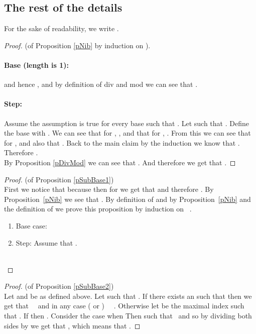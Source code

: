 \documentclass[envcountsame]{llncs}
\begin{document}
\subsection{The rest of the details}
\noindent
For the sake of readability, we write .

\begin{proof}(of Proposition \ref{pNib} by induction on ). 
  \paragraph{Base (length is 1):}  and hence ,  and by
  definition of div and mod we can see
  that  .
  \paragraph{Step:} Assume the assumption is true for every base 
  such that .  Let  such that . Define the base
   with .
We can see
  that for , , and that for ,
  .  From this we can see that for ,  and also that
  .
  Back to the main claim by the induction we know that
  .
  Therefore . \\
  By Proposition \ref{pDivMod} we can see that .
  And therefore we get that .
\end{proof} \bigskip

\begin{proof}(of Proposition \ref{pSubBase1})\\
  First we notice that because  then for  we
  get that  and therefore . By
  Proposition~\ref{pNib} we see that .  By
  definition of  and by Proposition~\ref{pNib} and
  the definition of  we prove this proposition by induction on \ .
	\begin{enumerate}
		\item 
			Base case: 
		\item 
			Step: Assume that .\\
			\\
			
	\end{enumerate}
\end{proof} \bigskip

\begin{proof}(of Proposition \ref{pSubBase2})\\
	Let  and  be as defined above. 
	Let  such that . 
	If there exists an  such that  then 
	we get that \  \ and in any case ( or ) \ \  .
	Otherwise let  be the maximal index such that .
	If  then . Consider the case when 
	Then  such that \    
	and so by dividing both sides by  we get that ,
	which means that   .
\end{proof} \bigskip
\end{document}
